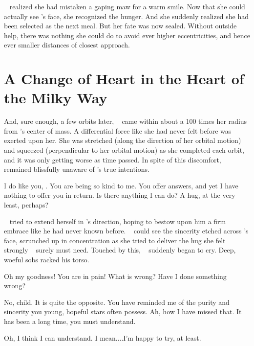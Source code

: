 \documentclass[main.tex]{subfiles}
\begin{document}
\par \nar \rmelectra~ realized she had mistaken a gaping maw for a warm smile.  Now that she could actually see \rmchiron's face, she recognized the hunger.  And she suddenly realized she had been selected as the next meal.  But her fate was now sealed.  Without outside help, there was nothing she could do to avoid ever higher eccentricities, and hence ever smaller distances of closest approach.  

\section{A Change of Heart in the Heart of the Milky Way}

\par \nar And, sure enough, a few orbits later, \rmelectra~ came within about a 100 times her radius from \rmchiron's center of mass.  A differential force like she had never felt before was exerted upon her.  She was stretched (along the direction of her orbital motion) and squeezed (perpendicular to her orbital motion) as she completed each orbit, and it was only getting worse as time passed.  In spite of this discomfort, \rmelectra~ remained blissfully unaware of \rmchiron's true intentions.

\par \Electra I do like you, \rmchiron.  You are being so kind to me.  You offer answers, and yet I have nothing to offer you in return.  Is there anything I can do?  A hug, at the very least, perhaps?

\par \nar \rmelectra~ tried to extend herself in \rmchiron's direction, hoping to bestow upon him a firm embrace like he had never known before.  \rmchiron~ could see the sincerity etched across \rmelectra's face, scrunched up in concentration as she tried to deliver the hug she felt strongly \rmchiron~ surely must need.  Touched by this, \rmchiron~ suddenly began to cry.  Deep, woeful sobs racked his torso.

\par \Electra Oh my goodness!  You are in pain!  What is wrong?  Have I done something wrong?

\par \Chiron No, child.  It is quite the opposite.  You have reminded me of the purity and sincerity you young, hopeful stars often possess.  Ah, how I have missed that.  It has been a long time, you must understand.  

\par \Electra Oh, I think I can understand.  I mean....I'm happy to try, at least.
\end{document}
